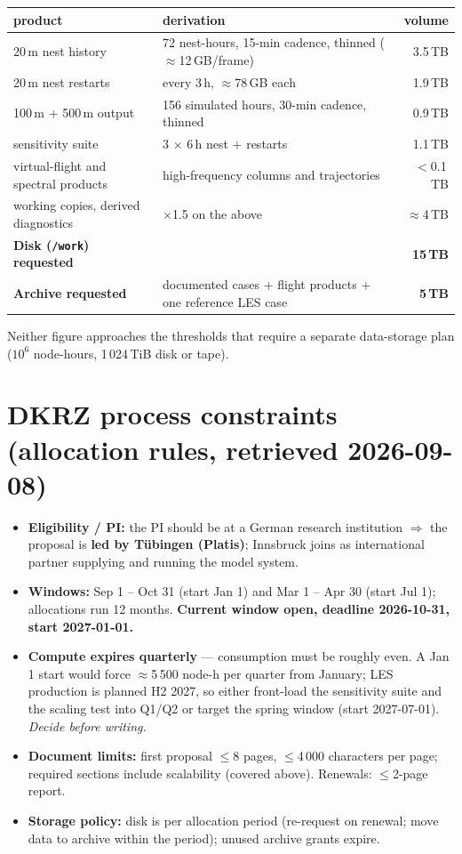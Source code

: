 \documentclass[10pt,a4paper]{article}
\begin{document}
\begin{center}
\begin{tabular}{@{}llr@{}}
\toprule
product & derivation & volume \\
\midrule
20\,m nest history & 72 nest-hours, 15-min cadence, thinned ($\approx$12\,GB/frame) & 3.5\,TB \\
20\,m nest restarts & every 3\,h, $\approx$78\,GB each & 1.9\,TB \\
100\,m + 500\,m output & 156 simulated hours, 30-min cadence, thinned & 0.9\,TB \\
sensitivity suite & 3 $\times$ 6\,h nest + restarts & 1.1\,TB \\
virtual-flight and spectral products & high-frequency columns and trajectories & $<$0.1\,TB \\
working copies, derived diagnostics & $\times$1.5 on the above & $\approx$4\,TB \\
\midrule
\textbf{Disk (\texttt{/work}) requested} & & \textbf{15\,TB} \\
\textbf{Archive requested} & documented cases + flight products + one reference LES case & \textbf{5\,TB} \\
\bottomrule
\end{tabular}
\end{center}

Neither figure approaches the thresholds that require a separate data-storage
plan ($10^6$ node-hours, 1\,024\,TiB disk or tape).

\section*{DKRZ process constraints (allocation rules, retrieved 2026-09-08)}
\begin{itemize}
\item \textbf{Eligibility / PI:} the PI should be at a German research
  institution $\Rightarrow$ the proposal is \textbf{led by Tübingen (Platis)};
  Innsbruck joins as international partner supplying and running the model
  system.
\item \textbf{Windows:} Sep 1 -- Oct 31 (start Jan 1) and Mar 1 -- Apr 30 (start
  Jul 1); allocations run 12 months. \textbf{Current window open, deadline
  2026-10-31, start 2027-01-01.}
\item \textbf{Compute expires quarterly} --- consumption must be roughly even. A
  Jan 1 start would force $\approx$5\,500 node-h per quarter from January; LES
  production is planned H2 2027, so either front-load the sensitivity suite and
  the scaling test into Q1/Q2 or target the spring window (start 2027-07-01).
  \emph{Decide before writing.}
\item \textbf{Document limits:} first proposal $\le$8 pages, $\le$4\,000
  characters per page; required sections include scalability (covered above).
  Renewals: $\le$2-page report.
\item \textbf{Storage policy:} disk is per allocation period (re-request on
  renewal; move data to archive within the period); unused archive grants expire.
\end{itemize}
\end{document}
